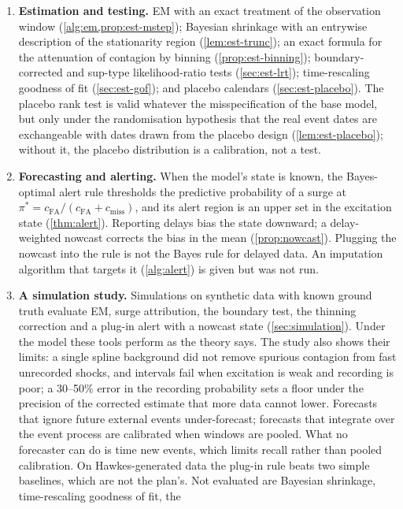 \begin{enumerate}[label=\textbf{C\arabic*},ref=C\arabic*,leftmargin=2.4em,itemsep=2pt]
  form.
  \item\label{contrib:est} \textbf{Estimation and testing.} EM with an exact
  treatment of the observation window (\cref{alg:em,prop:est-mstep}); Bayesian
  shrinkage with an entrywise description of the stationarity region
  (\cref{lem:est-trunc}); an exact formula for the attenuation of contagion by
  binning (\cref{prop:est-binning}); boundary-corrected and sup-type
  likelihood-ratio tests (\cref{sec:est-lrt}); time-rescaling goodness of fit
  (\cref{sec:est-gof}); and placebo calendars (\cref{sec:est-placebo}). The
  placebo rank test is valid whatever the misspecification of the base model,
  but only under the randomisation hypothesis that the real event dates are
  exchangeable with dates drawn from the placebo design
  (\cref{lem:est-placebo}); without it, the placebo distribution is a
  calibration, not a test.
  \item\label{contrib:alert} \textbf{Forecasting and alerting.} When the
  model's state is known, the Bayes-optimal alert rule thresholds the
  predictive probability of a surge at
  $\pi^*=c_{\mathrm{FA}}/(c_{\mathrm{FA}}+c_{\mathrm{miss}})$, and its alert
  region is an upper set in the excitation state (\cref{thm:alert}). Reporting
  delays bias the state downward; a delay-weighted nowcast corrects the bias
  in the mean (\cref{prop:nowcast}). Plugging the nowcast into the rule is not
  the Bayes rule for delayed data. An imputation algorithm that targets it
  (\cref{alg:alert}) is given but was not run.
  \item\label{contrib:sim} \textbf{A simulation study.} Simulations on
  synthetic data with known ground truth evaluate EM, surge attribution, the
  boundary test, the thinning correction and a plug-in alert with a nowcast
  state (\cref{sec:simulation}). Under the model these tools perform as the
  theory says. The study also shows their limits: a single spline background
  did not remove spurious contagion from fast unrecorded shocks, and intervals
  fail when excitation is weak and recording is poor; a 30--50\% error in the
  recording probability sets a floor under the precision of the corrected
  estimate that more data cannot lower. Forecasts that ignore future external
  events under-forecast; forecasts that integrate over the event process are
  calibrated when windows are pooled. What no forecaster can do is time new
  events, which limits recall rather than pooled calibration. On
  Hawkes-generated data the plug-in rule beats two simple baselines, which are
  not the plan's. Not
  evaluated are Bayesian shrinkage, time-rescaling goodness of fit, the

\end{enumerate}
